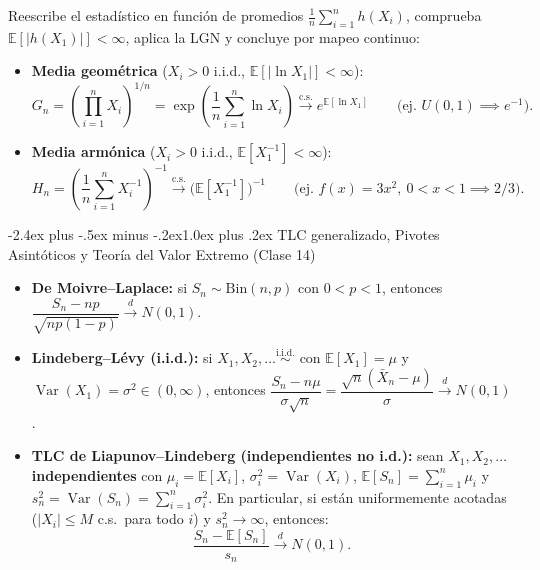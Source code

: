 \documentclass[10pt,a4paper]{article}
\makeatletter
\newcommand{\E}{\mathbb{E}}
\newcommand{\Var}{\operatorname{Var}}
\newcommand{\iid}{\overset{\text{i.i.d.}}{\sim}}
\newcommand{\dto}{\xrightarrow{\;d\;}}
\newcommand{\dcs}{\xrightarrow{\mathrm{c.s.}}}
\renewcommand\section{\@startsection{section}{1}{0pt}%
  {-2.4ex plus -.5ex minus -.2ex}{1.0ex plus .2ex}%
  {\normalfont\large\bfseries\color{seccolor}}}
\makeatother
\begin{document}
\begin{notebox}[frametitle={Promedios no lineales (receta de Sesión 2)}]
Reescribe el estadístico en función de promedios $\frac{1}{n}\sum_{i=1}^n h(X_i)$, comprueba $\E[|h(X_1)|] < \infty$, aplica la LGN y concluye por mapeo continuo:
\begin{itemize}
  \item \textbf{Media geométrica} ($X_i > 0$ i.i.d., $\E[|\ln X_1|] < \infty$):
  \[
  G_n = \left(\prod_{i=1}^n X_i\right)^{1/n} = \exp\!\left(\frac{1}{n}\sum_{i=1}^n \ln X_i\right) \dcs e^{\E[\ln X_1]} \qquad \big(\text{ej. } U(0,1) \implies e^{-1}\big).
  \]
  \item \textbf{Media armónica} ($X_i > 0$ i.i.d., $\E[X_1^{-1}] < \infty$):
  \[
  H_n = \left(\frac{1}{n}\sum_{i=1}^n X_i^{-1}\right)^{-1} \dcs \big(\E[X_1^{-1}]\big)^{-1} \qquad \big(\text{ej. } f(x)=3x^2,\ 0 < x < 1 \implies 2/3\big).
  \]
\end{itemize}
\end{notebox}

\section{TLC generalizado, Pivotes Asintóticos y Teoría del Valor Extremo \textmd{(Clase 14)}}

\begin{thmbox}[frametitle={Teoremas del Límite Central (De Moivre--Laplace, Lindeberg--Lévy y no i.d.)}]
\begin{itemize}
  \item \textbf{De Moivre--Laplace:} si $S_n \sim \text{Bin}(n,p)$ con $0 < p < 1$, entonces $\dfrac{S_n - np}{\sqrt{np(1-p)}} \dto N(0,1)$.
  \item \textbf{Lindeberg--Lévy (i.i.d.):} si $X_1, X_2, \dots \iid$ con $\E[X_1]=\mu$ y $\Var(X_1)=\sigma^2 \in (0,\infty)$, entonces $\dfrac{S_n - n\mu}{\sigma\sqrt{n}} = \dfrac{\sqrt{n}(\bar X_n - \mu)}{\sigma} \dto N(0,1)$.
  \item \textbf{TLC de Liapunov--Lindeberg (independientes no i.d.):} sean $X_1, X_2, \dots$ \textbf{independientes} con $\mu_i = \E[X_i]$, $\sigma_i^2 = \Var(X_i)$, $\E[S_n] = \sum_{i=1}^n \mu_i$ y $s_n^2 = \Var(S_n) = \sum_{i=1}^n \sigma_i^2$. En particular, si están uniformemente acotadas ($|X_i| \le M$ c.s.\ para todo $i$) y $s_n^2 \to \infty$, entonces:
  \[
  \frac{S_n - \E[S_n]}{s_n} \dto N(0,1).
  \]
\end{itemize}
\end{thmbox}
\end{document}
